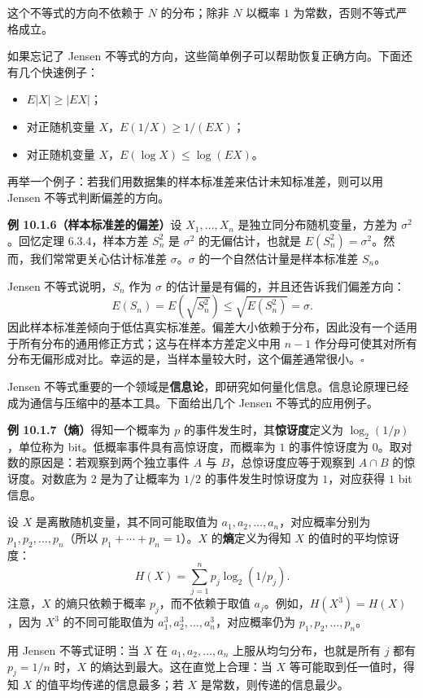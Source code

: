 \documentclass[UTF8, 12pt, fontset=fandol, oneside]{ctexart}
\begin{document}
这个不等式的方向不依赖于 $N$ 的分布；除非 $N$ 以概率 $1$ 为常数，否则不等式严格成立。

如果忘记了 Jensen 不等式的方向，这些简单例子可以帮助恢复正确方向。下面还有几个快速例子：
\begin{itemize}
  \item $E|X|\ge |EX|$；
  \item 对正随机变量 $X$，$E(1/X)\ge 1/(EX)$；
  \item 对正随机变量 $X$，$E(\log X)\le \log(EX)$。
\end{itemize}

再举一个例子：若我们用数据集的样本标准差来估计未知标准差，则可以用 Jensen 不等式判断偏差的方向。

\noindent\textbf{例 10.1.6（样本标准差的偏差）}\quad 设 $X_1,\ldots,X_n$ 是独立同分布随机变量，方差为 $\sigma^2$。回忆定理 6.3.4，样本方差 $S_n^2$ 是 $\sigma^2$ 的无偏估计，也就是 $E(S_n^2)=\sigma^2$。然而，我们常常更关心估计标准差 $\sigma$。$\sigma$ 的一个自然估计量是样本标准差 $S_n$。

Jensen 不等式说明，$S_n$ 作为 $\sigma$ 的估计量是有偏的，并且还告诉我们偏差方向：
\[
  E(S_n)=E\left(\sqrt{S_n^2}\right)\le \sqrt{E(S_n^2)}=\sigma.
\]
因此样本标准差倾向于低估真实标准差。偏差大小依赖于分布，因此没有一个适用于所有分布的通用修正方式；这与在样本方差定义中用 $n-1$ 作分母可使其对所有分布无偏形成对比。幸运的是，当样本量较大时，这个偏差通常很小。$\square$

Jensen 不等式重要的一个领域是\textbf{信息论}，即研究如何量化信息。信息论原理已经成为通信与压缩中的基本工具。下面给出几个 Jensen 不等式的应用例子。

\noindent\textbf{例 10.1.7（熵）}\quad 得知一个概率为 $p$ 的事件发生时，其\textbf{惊讶度}定义为 $\log_2(1/p)$，单位称为 bit。低概率事件具有高惊讶度，而概率为 $1$ 的事件惊讶度为 $0$。取对数的原因是：若观察到两个独立事件 $A$ 与 $B$，总惊讶度应等于观察到 $A\cap B$ 的惊讶度。对数底为 $2$ 是为了让概率为 $1/2$ 的事件发生时惊讶度为 $1$，对应获得 $1$ bit 信息。

设 $X$ 是离散随机变量，其不同可能取值为 $a_1,a_2,\ldots,a_n$，对应概率分别为 $p_1,p_2,\ldots,p_n$（所以 $p_1+\cdots+p_n=1$）。$X$ 的\textbf{熵}定义为得知 $X$ 的值时的平均惊讶度：
\[
  H(X)=\sum_{j=1}^n p_j\log_2(1/p_j).
\]
注意，$X$ 的熵只依赖于概率 $p_j$，而不依赖于取值 $a_j$。例如，$H(X^3)=H(X)$，因为 $X^3$ 的不同可能取值为 $a_1^3,a_2^3,\ldots,a_n^3$，对应概率仍为 $p_1,p_2,\ldots,p_n$。

用 Jensen 不等式证明：当 $X$ 在 $a_1,a_2,\ldots,a_n$ 上服从均匀分布，也就是所有 $j$ 都有 $p_j=1/n$ 时，$X$ 的熵达到最大。这在直觉上合理：当 $X$ 等可能取到任一值时，得知 $X$ 的值平均传递的信息最多；若 $X$ 是常数，则传递的信息最少。
\end{document}
